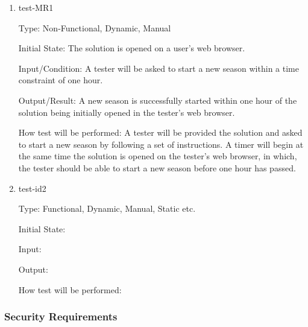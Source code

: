 \documentclass[12pt, titlepage]{article}
\begin{document}
\begin{enumerate}

  \item{test-MR1\\}
  
  Type: Non-Functional, Dynamic, Manual
            
  Initial State: The solution is opened on a user's web browser.
            
  Input/Condition: A tester will be asked to start a new season within a time constraint
  of one hour.
            
  Output/Result: A new season is successfully started within one hour of the solution
  being initially opened in the tester's web browser.
            
  How test will be performed: A tester will be provided the solution and asked to start
  a new season by following a set of instructions. A timer will begin at the same time
  the solution is opened on the tester's web browser, in which, the tester should be
  able to start a new season before one hour has passed.
            
  \item{test-id2\\}
  
  Type: Functional, Dynamic, Manual, Static etc.
            
  Initial State: 
            
  Input: 
            
  Output: 
            
  How test will be performed: 
  
  \end{enumerate}

\subsubsection{Security Requirements}
\end{document}
